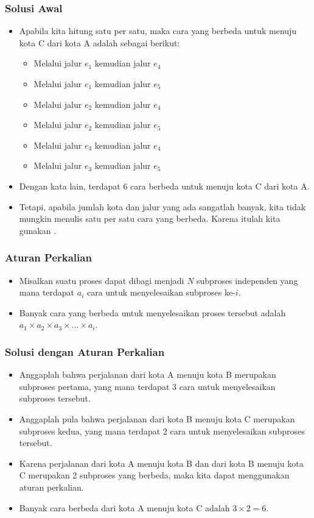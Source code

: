 \begin{frame}
\frametitle{Solusi Awal}
\begin{itemize}
  \item Apabila kita hitung satu per satu, maka cara yang berbeda untuk menuju kota C dari kota A adalah sebagai berikut:
  \begin{itemize}
    \item Melalui jalur $e_{1}$ kemudian jalur $e_{4}$
    \item Melalui jalur $e_{1}$ kemudian jalur $e_{5}$
    \item Melalui jalur $e_{2}$ kemudian jalur $e_{4}$
    \item Melalui jalur $e_{2}$ kemudian jalur $e_{5}$
    \item Melalui jalur $e_{3}$ kemudian jalur $e_{4}$
    \item Melalui jalur $e_{3}$ kemudian jalur $e_{5}$
  \end{itemize}
  \item Dengan kata lain, terdapat 6 cara berbeda untuk menuju kota C dari kota A.
  \item Tetapi, apabila jumlah kota dan jalur yang ada sangatlah banyak, kita tidak mungkin menulis satu per satu cara yang berbeda. Karena itulah kita gunakan .
\end{itemize}
\end{frame} 

\begin{frame}
\frametitle{Aturan Perkalian}
\begin{itemize}
  \item Misalkan suatu proses dapat dibagi menjadi $N$ subproses independen yang mana terdapat $a_{i}$ cara untuk menyelesaikan subproses ke-$i$.
  \item Banyak cara yang berbeda untuk menyelesaikan proses tersebut adalah $a_{1} \times a_{2} \times a_{3} \times ... \times a_{i}$.	
\end{itemize}
\end{frame}

\begin{frame}
\frametitle{Solusi dengan Aturan Perkalian}
\begin{itemize}
  \item Anggaplah bahwa perjalanan dari kota A menuju kota B merupakan subproses pertama, yang mana terdapat 3 cara untuk menyelesaikan subproses tersebut.
  \item Anggaplah pula bahwa perjalanan dari kota B menuju kota C merupakan subproses kedua, yang mana terdapat 2 cara untuk menyelesaikan subproses tersebut.
  \item Karena perjalanan dari kota A menuju kota B dan dari kota B menuju kota C merupakan 2 subproses yang berbeda, maka kita dapat menggunakan aturan perkalian.
  \item Banyak cara berbeda dari kota A menuju kota C adalah $3 \times 2 = 6$.
\end{itemize}
\end{frame}

